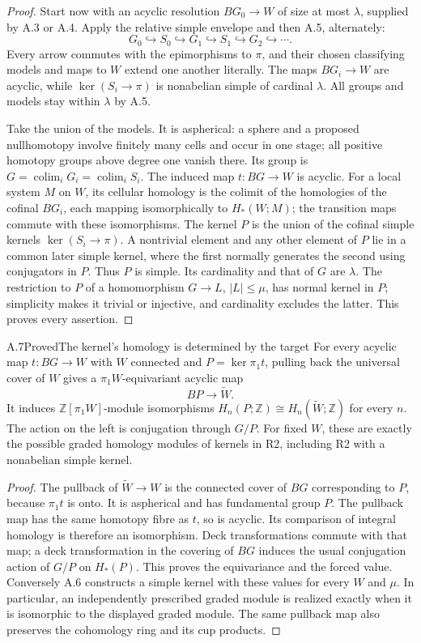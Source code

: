 \begin{proof}
Start now with an acyclic resolution $BG_0\to W$ of size at most
$\lambda$, supplied by A.3 or A.4. Apply the relative simple envelope
and then A.5, alternately:
\[
 G_0\hookrightarrow S_0\hookrightarrow G_1\hookrightarrow S_1
       \hookrightarrow G_2\hookrightarrow\cdots .
\]
Every arrow commutes with the epimorphisms to $\pi$, and their chosen
classifying models and maps to $W$ extend one another literally. The
maps $BG_i\to W$ are acyclic, while
$\ker(S_i\to\pi)$ is nonabelian simple of cardinal $\lambda$.
All groups and models stay within $\lambda$ by A.5.

Take the union of the models. It is aspherical: a sphere and a proposed
nullhomotopy involve finitely many cells and occur in one stage;
all positive homotopy groups above degree one vanish there. Its group
is $G=\operatorname{colim}_iG_i=\operatorname{colim}_iS_i$.
The induced map $t:BG\to W$ is acyclic. For a local system $M$ on $W$,
its cellular homology is the colimit of the homologies of the cofinal
$BG_i$, each mapping isomorphically to $H_*(W;M)$; the transition maps
commute with these isomorphisms. The kernel $P$ is the union of the
cofinal simple kernels $\ker(S_i\to\pi)$. A nontrivial element and
any other element of $P$ lie in a common later simple kernel, where
the first normally generates the second using conjugators in $P$.
Thus $P$ is simple. Its cardinality and that of $G$ are $\lambda$.
The restriction to $P$ of a homomorphism $G\to L$, $|L|\leq\mu$,
has normal kernel in $P$; simplicity makes it trivial or injective,
and cardinality excludes the latter. This proves every assertion.
\end{proof}

\begin{claim}{A.7}{Proved}{The kernel's homology is determined by the target}
For every acyclic map $t:BG\to W$ with $W$ connected and
$P=\ker\pi_1t$, pulling back the universal cover of $W$ gives a
$\pi_1W$-equivariant acyclic map
\[
 BP\longrightarrow\widetilde W.
\]
It induces $\mathbb Z[\pi_1W]$-module isomorphisms
$H_n(P;\mathbb Z)\cong H_n(\widetilde W;\mathbb Z)$ for every $n$.
The action on the left is conjugation through $G/P$.
For fixed $W$, these are exactly the possible graded homology modules
of kernels in R2, including R2 with a nonabelian simple kernel.
\end{claim}
\begin{proof}
The pullback of $\widetilde W\to W$ is the connected cover of $BG$
corresponding to $P$, because $\pi_1t$ is onto. It is aspherical and
has fundamental group $P$. The pullback map has the same homotopy
fibre as $t$, so is acyclic. Its comparison of integral homology is
therefore an isomorphism. Deck transformations commute with that map;
a deck transformation in the covering of $BG$ induces the usual
conjugation action of $G/P$ on $H_*(P)$. This proves the equivariance
and the forced value. Conversely A.6 constructs a simple kernel with
these values for every $W$ and $\mu$. In particular, an independently
prescribed graded module is realized exactly when it is isomorphic to
the displayed graded module. The same pullback map also preserves the
cohomology ring and its cup products.
\end{proof}

